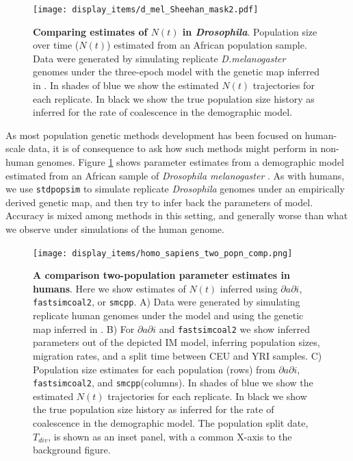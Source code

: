 \documentclass[12pt,halfline,a4paper]{ouparticle}
\newcommand{\stdpopsim}{\texttt{stdpopsim}\xspace}
\newcommand{\dadi}{$\partial a \partial i$\xspace}
\newcommand{\smcpp}{\texttt{smcpp}\xspace}
\begin{document}
\begin{figure}
\begin{center}
\texttt{[image: display\_items/d\_mel\_Sheehan\_mask2.pdf]}
\caption{\textbf{Comparing estimates of $N(t)$ in \emph{Drosophila}}. Population
size over time ($N(t)$) estimated from an African population sample. Data were generated by simulating
replicate \emph{D.melanogaster} genomes under the three-epoch \cite{sheehan2016deep} model
with the genetic map inferred in \cite{comeron2012many}. In shades of blue we show the estimated
$N(t)$ trajectories for each replicate. In black we show the true population size history as inferred
for the rate of coalescence in the demographic model.}
\label{fig:n_t_sheehan}
\end{center}
\end{figure}

As most population genetic methods development has been focused on human-scale
data, it is of consequence to ask how such methods might perform in non-human
genomes. Figure \ref{fig:n_t_sheehan} shows parameter estimates from a demographic
model estimated from an African sample of \emph{Drosophila melanogaster} \citep{sheehan2016deep}.
As with humans, we use \stdpopsim to simulate replicate \emph{Drosophila} genomes under
an empirically derived genetic map, and then try to infer back the parameters of model.
Accuracy is mixed among methods in this setting, and generally worse than what we
observe under simulations of the human genome.



\begin{figure}
\begin{center}
\texttt{[image: display\_items/homo\_sapiens\_two\_popn\_comp.png]}
\caption{\textbf{A comparison two-population parameter estimates in humans}. Here we show estimates of $N(t)$ inferred using \dadi, \texttt{fastsimcoal2}, or \smcpp.
A) Data were generated by simulating
replicate human genomes under the \cite{gutenkunst2009inferring} model and using the genetic map
inferred in \cite{international2007second}. B) For \dadi and \texttt{fastsimcoal2} we show inferred
parameters out of the depicted IM model, inferring population sizes, migration rates, and a split
time between CEU and YRI samples. C) Population size estimates for each population (rows)
from \dadi, \texttt{fastsimcoal2}, and \smcpp (columns). In shades of blue we show the estimated
$N(t)$ trajectories for each replicate. In black we show the true population size history as inferred
for the rate of coalescence in the demographic model. The population split date, $T_{div}$, is shown as
an inset panel, with a common X-axis to the background figure.}
\label{fig:IM_popn_human}
\end{center}
\end{figure}
\end{document}
